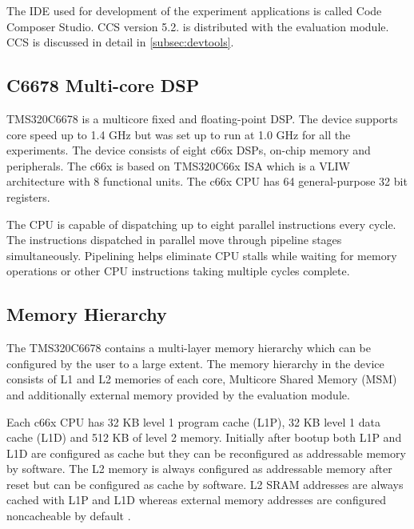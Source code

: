 The IDE used for development of the experiment applications is called Code Composer Studio. CCS version 5.2. is distributed with the evaluation module. CCS is discussed in detail in \ref{subsec:devtools}. 

\subsection{C6678 Multi-core DSP}
\label{subsec:c66x}
TMS320C6678 is a multicore fixed and floating-point DSP. The device supports core speed up to 1.4 GHz but was set up to run at 1.0 GHz for all the experiments. The device consists of eight c66x DSPs, on-chip memory and peripherals. The c66x is based on TMS320C66x ISA which is a VLIW architecture with 8 functional units. The c66x CPU has 64 general-purpose 32 bit registers. \cite{sprugh7} 

The CPU is capable of dispatching up to eight parallel instructions every cycle. The instructions dispatched in parallel move through pipeline stages simultaneously. Pipelining helps eliminate CPU stalls while waiting for memory operations or other CPU instructions taking multiple cycles complete. \cite{sprugh7} 

\subsection{Memory Hierarchy}
\label{subsec:c66memory}


The TMS320C6678 contains a multi-layer memory hierarchy which can be configured by the user to a large extent. The memory hierarchy in the device consists of L1 and L2 memories of each core, Multicore Shared Memory (MSM) and additionally external memory provided by the evaluation module.

Each c66x CPU has 32 KB level 1 program cache (L1P), 32 KB level 1 data cache (L1D) and 512 KB of level 2 memory. Initially after bootup both L1P and L1D are configured as cache but they can be reconfigured as addressable memory by software. The L2 memory is always configured as addressable memory after reset but can be configured as cache by software. \cite{tmsdatasheet} L2 SRAM addresses are always cached with L1P and L1D whereas external memory addresses are configured noncacheable by default \cite{cacheguide}.

